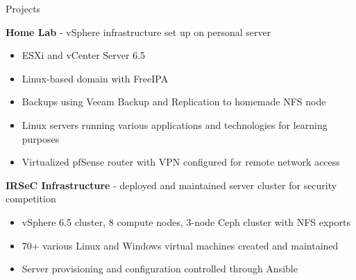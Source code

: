 \documentclass{resume} %
\begin{document}
\begin{rSection}{Projects}

    {\bf Home Lab} - vSphere infrastructure set up on personal server
    \begin{itemize}[noitemsep]
        \item ESXi and vCenter Server 6.5
        \item Linux-based domain with FreeIPA
        \item Backups using Veeam Backup and Replication to homemade NFS node
        \item Linux servers running various applications and technologies for
            learning purposes
        \item Virtualized pfSense router with VPN configured for remote network
            access
    \end{itemize}

    {\bf IRSeC Infrastructure} - deployed and maintained server cluster for
    security competition
    \begin{itemize}[noitemsep]
        \item vSphere 6.5 cluster, 8 compute nodes, 3-node Ceph cluster with
            NFS exports
        \item 70+ various Linux and Windows virtual machines created and
            maintained
        \item Server provisioning and configuration controlled through Ansible
    \end{itemize}

\end{rSection}

\end{document}
